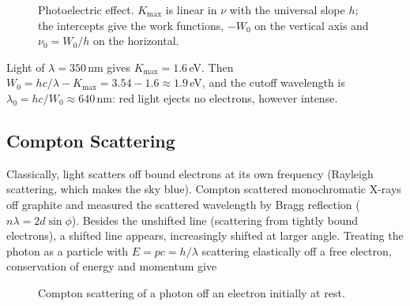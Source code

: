 \begin{figure}[ht]
\centering
{}
\caption{Photoelectric effect. $K_{\max}$ is linear in $\nu$ with the universal slope $h$; the intercepts give the work functions, $-W_0$ on the vertical axis and $\nu_0 = W_0/h$ on the horizontal.}
\end{figure}

\begin{example}
Light of $\lambda = 350$\,nm gives $K_{\max} = 1.6$\,eV. Then $W_0 = hc/\lambda - K_{\max} = 3.54 - 1.6\approx1.9$\,eV, and the cutoff wavelength is $\lambda_0 = hc/W_0\approx640$\,nm: red light ejects no electrons, however intense.
\end{example}

\subsection{Compton Scattering}

Classically, light scatters off bound electrons at its own frequency (Rayleigh scattering, which makes the sky blue). Compton scattered monochromatic X-rays off graphite and measured the scattered wavelength by Bragg reflection ($n\lambda = 2d\sin\phi$). Besides the unshifted line (scattering from tightly bound electrons), a shifted line appears, increasingly shifted at larger angle. Treating the photon as a particle with $E = pc = h/\lambda$ scattering elastically off a free electron, conservation of energy and momentum give

\begin{figure}[ht]
\centering
{}
\caption{Compton scattering of a photon off an electron initially at rest.}
\end{figure}

